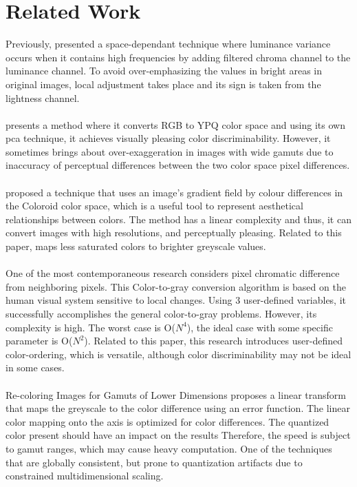 \documentclass{article}
\begin{document}
\section{Related Work}
Previously, \cite{BalaEschbach} presented a space-dependant technique where luminance variance occurs when it contains high frequencies by adding filtered chroma channel to the luminance channel. To avoid over-emphasizing the values in bright areas in original images, local adjustment takes place and its sign is taken from the lightness channel. \\\\
\cite{journals/pr/GrundlandD07} presents a method where it converts RGB to YPQ color space and using its own pca technique, it achieves visually pleasing color discriminability. However, it sometimes brings about over-exaggeration in images with wide gamuts due to inaccuracy of perceptual differences between the two color space pixel differences. \\\\
\cite{cadik07color_to_gray}  proposed a technique that uses an image’s gradient field by colour differences in the Coloroid color space, which is a useful tool to represent aesthetical relationships between colors. The method has a linear complexity and thus, it can convert images with high resolutions, and perceptually pleasing. Related to this paper, \cite{cadik07color_to_gray}  maps less saturated colors to brighter greyscale values. \cite{kim09_c2g} \\\\
One of the most contemporaneous research \cite{Gooch05color2gray:salience-preserving} considers pixel chromatic difference from neighboring pixels. This Color-to-gray conversion algorithm is based on the human visual system sensitive to local changes. Using 3 user-defined variables, it successfully accomplishes the general color-to-gray problems. However, its complexity is high. The worst case is O($N^4$), the ideal case with some specific parameter is O($N^2$). Related to this paper, this research introduces user-defined color-ordering, which is versatile, although color discriminability may not be ideal in some cases. \\\\
Re-coloring Images for Gamuts of Lower Dimensions \cite{Rasche05re-coloringimages} proposes a linear transform that maps the greyscale to the color difference using an error function. The linear color mapping onto the axis is optimized for color differences. The quantized color present should have an impact on the results Therefore, the speed is subject to gamut ranges, which may cause heavy computation. One of the techniques that are globally consistent, but prone to quantization artifacts due to constrained multidimensional scaling. \cite{cadik08perceptual}\\\\
\end{document}
